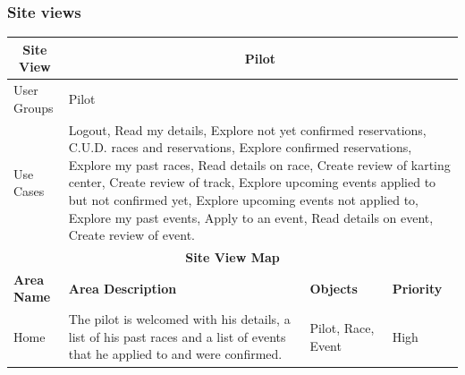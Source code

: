 \documentclass{beamer}
\begin{document}
\begin{frame}
    \frametitle{Site views}
    \begin{table}
        \centering
        \tiny
        \setlength{\tabcolsep}{1pt}
        \begin{tabular}{|m{2cm}|m{4cm}|m{3cm}|m{1cm}|}
        \hline
        \multicolumn{1}{|c|}{\textbf{Site View}} & \multicolumn{3}{c|}{\textbf{Pilot}} \\
        \hline
        User Groups & \multicolumn{3}{m{8cm}|}{Pilot} \\
        \hline
        Use Cases & \multicolumn{3}{m{8cm}|}{Logout,
        Read my details, Explore not yet confirmed reservations, 
        C.U.D. races and reservations, Explore confirmed reservations, 
        Explore my past races, Read details on race, Create review of karting center, 
        Create review of track, Explore upcoming events applied to but not confirmed yet, 
        Explore upcoming events not applied to, Explore my past events, Apply to an event, 
        Read details on event, Create review of event.} \\
        \hline
        \multicolumn{4}{|c|}{\textbf{Site View Map}} \\
        \hline
        \textbf{Area Name} & \textbf{Area Description} & \textbf{Objects} & \textbf{Priority} \\
        \hline
        Home & The pilot is welcomed with his details, a list of his past races 
        and a list of events that he applied to and were confirmed.
         & Pilot, Race, Event & High \\
         \hline
        \end{tabular}
    \end{table}
\end{frame}
\end{document}
